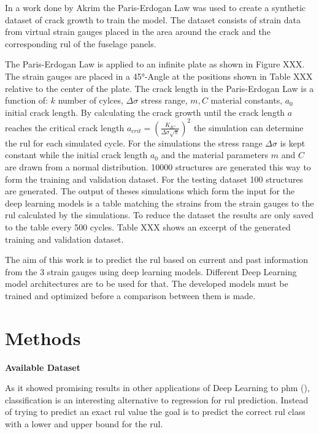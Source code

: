 \documentclass[conference]{IEEEtran}
\begin{document}
In a work done by Akrim \cite{Akrim} the Paris-Erdogan Law \cite{Paris1963} was used to create a synthetic dataset of crack growth to train the model. The dataset consists of strain data from virtual strain gauges placed in the area around the crack and the corresponding \gls{rul} of the fuselage panels.

The Paris-Erdogan Law is applied to an infinite plate as shown in Figure XXX. The strain gauges are placed in a 45°-Angle at the positions shown in Table XXX relative to the center of the plate. The crack length in the Paris-Erdogan Law is a function of: $k$ number of cylces, $\Delta \sigma$ stress range, $m, C$ material constants, $a_0$ initial crack length. By calculating the crack growth until the crack length $a$ reaches the critical crack length $a_{crit}=(\frac{K_{IC}}{\Delta \sigma \sqrt{\pi}})^2$ the simulation can determine the \gls{rul} for each simulated cycle. For the simulations the stress range $\Delta \sigma$ is kept constant while the initial crack length $a_0$ and the material parameters $m$ and $C$ are drawn from a normal distribution. 10000 structures are generated this way to form the training and validation dataset. For the testing dataset 100 structures are generated. The output of theses simulations which form the input for the deep learning models is a table matching the strains from the strain gauges to the \gls{rul} calculated by the simulations. To reduce the dataset the results are only saved to the table every 500 cycles. Table XXX shows an excerpt of the generated training and validation dataset.

The aim of this work is to predict the \gls{rul} based on current and past information from the 3 strain gauges using deep learning models. Different Deep Learning model architectures are to be used for that. The developed models must be trained and optimized before a comparison between them is made.

\section{Methods}
\label{sec:methods}

\noindent
\textbf{Available Dataset}


As it showed promising results in other applications of Deep Learning to \gls{phm} (\cite{Liu2019a, Xiao2016}), classification is an interesting alternative to regression for \gls{rul} prediction. Instead of trying to predict an exact \gls{rul} value the goal is to predict the correct \gls{rul} class with a lower and upper bound for the \gls{rul}.
\end{document}
